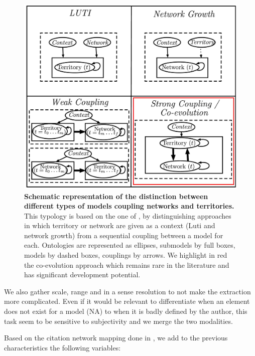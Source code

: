 \documentclass[10pt]{article}
\begin{document}
\begin{figure}
\begin{center}
\includegraphics[width=\linewidth]{Fig2.jpg}
\end{center}
\caption{\textbf{Schematic representation of the distinction between different types of models coupling networks and territories.} This typology is based on the one of \cite{raimbault2018caracterisation}, by distinguishing approaches in which territory or network are given as a context (Luti and network growth) from a sequential coupling between a model for each. Ontologies are represented as ellipses, submodels by full boxes, models by dashed boxes, couplings by arrows. We highlight in red the co-evolution approach which remains rare in the literature and has significant development potential.\label{fig:modelography:coevolution}}
\end{figure}


We also gather scale, range and in a sense resolution to not make the extraction more complicated. Even if it would be relevant to differentiate when an element does not exist for a model (NA) to when it is badly defined by the author, this task seem to be sensitive to subjectivity and we merge the two modalities.

Based on the citation network mapping done in \cite{raimbault2018caracterisation}, we add to the previous characteristics the following variables:
\end{document}
